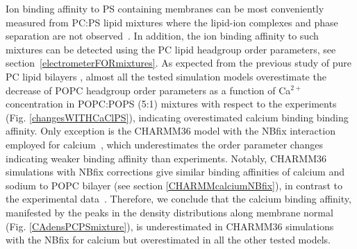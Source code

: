 \documentclass[aps,prl,superscriptaddress,twocolumn]{revtex4}
\begin{document}
Ion binding affinity to PS containing membranes can be most conveniently measured 
from PC:PS lipid mixtures where the lipid-ion complexes and phase separation are 
not observed~\cite{feigenson86,mattai89,roux90,roux91}. In addition, the ion
binding affinity to such mixtures can be detected using the PC lipid headgroup order parameters,
see section~\ref{electrometerFORmixtures}. As expected from the previous study of pure PC lipid
bilayers \cite{catte16}, almost all the tested simulation models overestimate the decrease of
POPC headgroup order parameters as a function of Ca$^{2+}$ concentration in POPC:POPS (5:1) mixtures 
with respect to the experiments \cite{roux90} (Fig. \ref{changesWITHCaClPS}), indicating overestimated
calcium binding binding affinity. Only exception is the CHARMM36 model with the NBfix
interaction employed for calcium~\cite{kim16}, which underestimates the order parameter changes
indicating weaker binding affinity than experiments.
Notably, CHARMM36 simulations with NBfix corrections \cite{venable13,kim16} give similar binding affinities of
calcium and sodium to POPC bilayer (see section \ref{CHARMMcalciumNBfix}), in contrast to the experimental 
data~\cite{cevc90,akutsu81,altenbach84}. Therefore, we conclude that the calcium binding affinity,
manifested by the peaks in the density distributions along membrane normal (Fig. \ref{CAdensPCPSmixture}),
is underestimated in CHARMM36 simulations with the NBfix for calcium \cite{kim16} but overestimated 
in all the other tested models.

\end{document}
